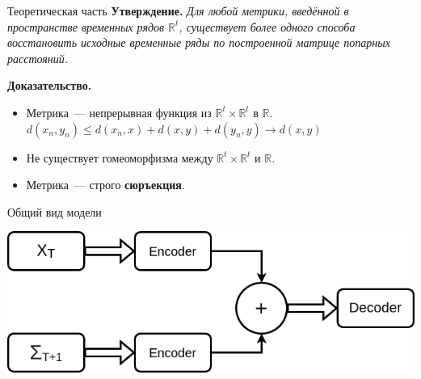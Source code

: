 \documentclass{beamer}
\begin{document}
\begin{frame}{Теоретическая часть}
	\textbf{Утверждение.} \textit{Для любой метрики, введённой в пространстве временных рядов $\mathbb{R}^t$, существует более одного способа восстановить исходные временные ряды по построенной матрице попарных расстояний.}
	
	\textbf{Доказательство.} 
	\begin{itemize}
		\item Метрика~--- непрерывная функция из $\mathbb{R}^t \times \mathbb{R}^t$ в $\mathbb{R}$.
		$d(x_n,y_n)\leqslant d(x_n,x)+d(x,y)+d(y_n,y)\to d(x,y)$
		
		\item Не существует гомеоморфизма между $\mathbb{R}^t \times \mathbb{R}^t$ и $\mathbb{R}$.
		
		\item Метрика~--- строго \textbf{сюръекция}.
	\end{itemize}
\end{frame}
\begin{frame}{Общий вид модели}
	
	\includegraphics[width=1\textwidth]{Model}
	
\end{frame}
\end{document}
